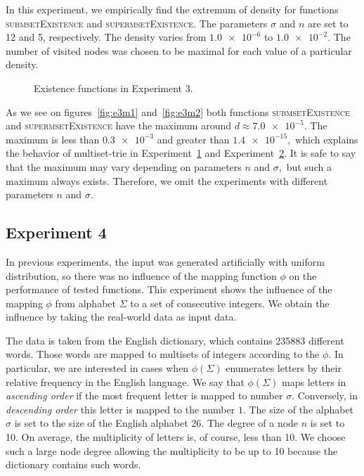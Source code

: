 In this experiment, we empirically find the extremum of density for functions 
\textsc{submsetExistence} and \textsc{supermsetExistence}. The parameters 
$\sigma$ and $n$ are set to 12 and 5, respectively. The density varies from 
$\num{1.0e-6}$ to $\num{1.0e-2}.$ The number of visited nodes was chosen to be 
maximal for each value of a particular density.

\begin{figure}
\center
{}
\caption{Existence functions in Experiment 3.}
\end{figure}

As we see on figures~\ref{fig:e3m1} and~\ref{fig:e3m2} both functions 
\textsc{submsetExistence} and \textsc{supermsetExistence} have the maximum 
around $d\approx \num{7.0e-5}.$ The maximum is less than $\num{0.3e-3}$ and 
greater than $\num{1.4e-15},$ which explains the behavior of multiset-trie in 
Experiment~\hyperref[s:exp1]{1} and Experiment~\hyperref[s:exp2]{2}. It is safe 
to say that the maximum may vary depending on parameters $n$ and $\sigma,$ but 
such a maximum always exists. Therefore, we omit the experiments with different 
parameters $n$ and $\sigma.$


\subsection{Experiment 4} \label{s:exp4}
In previous experiments, the input was generated artificially with uniform 
distribution, so there was no influence of the mapping function $\phi$ on 
the performance of tested functions. This experiment shows the influence of the 
mapping $\phi$ from alphabet $\Sigma$ to a set of consecutive integers. 
We obtain the influence by taking the real-world data as input data. 

The data is taken from the English dictionary, which contains 235883 different words. 
Those words are mapped to multisets of integers according to the $\phi.$ In 
particular, we are interested in cases when $\phi(\Sigma)$ enumerates 
letters by their relative frequency in the English language. We say that $\phi(\Sigma)$ 
maps letters in \emph{ascending order} if the most frequent letter is mapped to 
number $\sigma.$ Conversely, in \emph{descending order} this letter is mapped to 
the number $1.$ The size of the alphabet $\sigma$ is set to the size of the English 
alphabet 26. The degree of a node $n$ is set to 10. On average, the multiplicity 
of letters is, of course, less than 10. We choose such a large node degree allowing 
the multiplicity to be up to 10 because the dictionary contains such words. 


